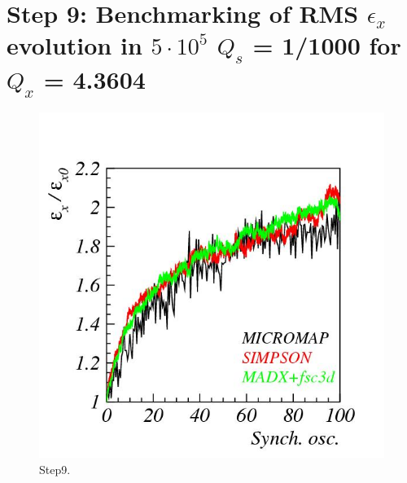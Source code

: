 \documentclass[a4paper]{cernatsnote}
\begin{document}
\section{Step 9: Benchmarking of RMS $\epsilon_x$ evolution in $5 \cdot 10^5$ $Q_s$ = 1/1000 for $Q_x$ = 4.3604}

\begin{figure}[!htb]
        \centering
        \includegraphics[width=0.5\columnwidth]{Step9_emittance.jpg}
        \caption{Step9.}
        \label{fig:step9}
\end{figure}
\end{document}

